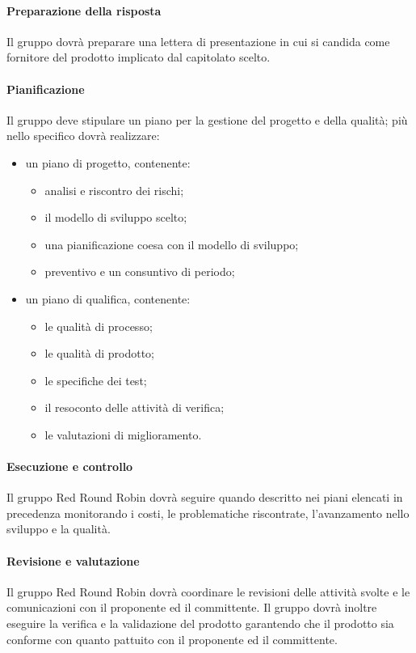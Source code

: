 		\paragraph{Preparazione della risposta}
			Il gruppo dovrà preparare una lettera di presentazione in cui si candida come fornitore del prodotto implicato dal capitolato scelto.
		\paragraph{Pianificazione}
			Il gruppo deve stipulare un piano per la gestione del progetto e della qualità; più nello specifico dovrà realizzare:
			\begin{itemize}
				\item un piano di progetto, contenente:
				\begin{itemize}
				 	\item analisi e riscontro dei rischi;
				 	\item il modello di sviluppo scelto;
				 	\item una pianificazione coesa con il modello di sviluppo;
				 	\item preventivo e un consuntivo di periodo;
				 \end{itemize} 
				\item un piano di qualifica, contenente: 
				\begin{itemize}
					\item le qualità di processo;
					\item le qualità di prodotto;
					\item le specifiche dei test;
					\item il resoconto delle attività di verifica;
					\item le valutazioni di miglioramento.
				\end{itemize}
			\end{itemize}
			
		\paragraph{Esecuzione e controllo}
			Il gruppo Red Round Robin dovrà seguire quando descritto nei piani elencati in precedenza monitorando i costi, le problematiche riscontrate, l'avanzamento nello sviluppo e la qualità.
		\paragraph{Revisione e valutazione}
			Il gruppo Red Round Robin dovrà coordinare le revisioni delle attività svolte e le comunicazioni con il proponente ed il committente. Il gruppo dovrà inoltre eseguire la verifica e la validazione del prodotto garantendo che il prodotto sia conforme con quanto pattuito con il proponente ed il committente.
